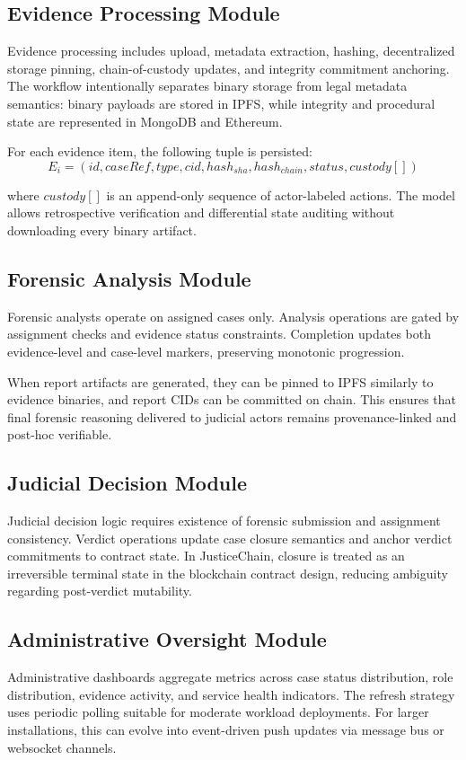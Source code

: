 \documentclass[conference]{IEEEtran}
\begin{document}
\subsection{Evidence Processing Module}
Evidence processing includes upload, metadata extraction, hashing, decentralized storage pinning, chain-of-custody updates, and integrity commitment anchoring. The workflow intentionally separates binary storage from legal metadata semantics: binary payloads are stored in IPFS, while integrity and procedural state are represented in MongoDB and Ethereum.

For each evidence item, the following tuple is persisted:
\begin{equation}
E_i = (id, caseRef, type, cid, hash_{sha}, hash_{chain}, status, custody[])
\end{equation}

where $custody[]$ is an append-only sequence of actor-labeled actions. The model allows retrospective verification and differential state auditing without downloading every binary artifact.

\subsection{Forensic Analysis Module}
Forensic analysts operate on assigned cases only. Analysis operations are gated by assignment checks and evidence status constraints. Completion updates both evidence-level and case-level markers, preserving monotonic progression.

When report artifacts are generated, they can be pinned to IPFS similarly to evidence binaries, and report CIDs can be committed on chain. This ensures that final forensic reasoning delivered to judicial actors remains provenance-linked and post-hoc verifiable.

\subsection{Judicial Decision Module}
Judicial decision logic requires existence of forensic submission and assignment consistency. Verdict operations update case closure semantics and anchor verdict commitments to contract state. In JusticeChain, closure is treated as an irreversible terminal state in the blockchain contract design, reducing ambiguity regarding post-verdict mutability.

\subsection{Administrative Oversight Module}
Administrative dashboards aggregate metrics across case status distribution, role distribution, evidence activity, and service health indicators. The refresh strategy uses periodic polling suitable for moderate workload deployments. For larger installations, this can evolve into event-driven push updates via message bus or websocket channels.
\end{document}
